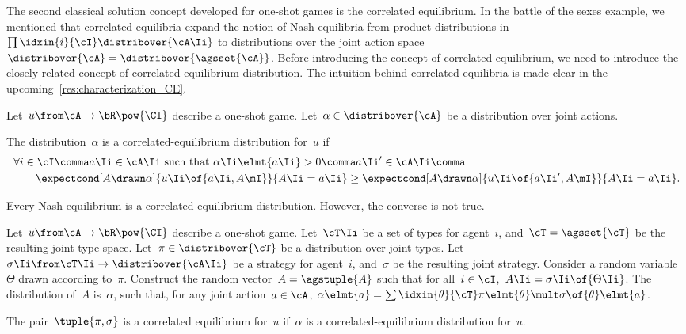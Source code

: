 The second classical solution concept developed for one-shot games is the correlated equilibrium.
In the battle of the sexes example, we mentioned that correlated equilibria expand the notion of Nash equilibria from product distributions in~\(\prod\idxin{i}{\cI} \distribover{\cA\Ii}\) to distributions over the joint action space~\(\distribover{\cA} = \distribover{\agsset{\cA}}\).
Before introducing the concept of correlated equilibrium, we need to introduce the closely related concept of correlated-equilibrium distribution.
The intuition behind correlated equilibria is made clear in the upcoming~\cref{res:characterization_CE}.

\begin{definition}
\label{def:correlated-equilibrium_distribution}
Let~\(u \from \cA \to \bR\pow{\CI}\) describe a one-shot game.
Let~\(\alpha \in \distribover{\cA}\) be a distribution over joint actions.

The distribution~\(\alpha\) is a correlated-equilibrium distribution for~\(u\) if
\[
\begin{aligned}
& \forall i \in \cI \comma
a\Ii \in \cA\Ii \text{ such that } \alpha\Ii \elmt{a\Ii} > 0\comma
a\Ii' \in \cA\Ii \comma \\
& \qquad \expectcond[A \drawn \alpha]{u\Ii \of{a\Ii, A\mI}}{A\Ii = a\Ii}
\ge
\expectcond[A \drawn \alpha]{u\Ii \of{a\Ii', A\mI}}{A\Ii = a\Ii}.
\end{aligned}
\]
\end{definition}

Every Nash equilibrium is a correlated-equilibrium distribution.
However, the converse is not true.

\begin{definition}
\label{def:correlated_equilibrium}
Let~\(u \from \cA \to \bR\pow{\CI}\) describe a one-shot game.
Let~\(\cT\Ii\) be a set of types for agent~\(i\), and~\(\cT = \agsset{\cT}\) be the resulting joint type space.
Let~\(\pi \in \distribover{\cT}\) be a distribution over joint types.
Let~\(\sigma\Ii \from \cT\Ii \to \distribover{\cA\Ii}\) be a strategy for agent~\(i\), and~\(\sigma\) be the resulting joint strategy.
Consider a random variable~\(\Theta\) drawn according to~\(\pi\).
Construct the random vector~\(A = \agstuple{A}\) such that for all~\(i \in \cI\),~\(A\Ii = \sigma\Ii \of{\Theta\Ii}\).
The distribution of~\(A\) is~\(\alpha\), such that, for any joint action~\(a \in \cA\), \(\alpha \elmt{a} = \sum\idxin{\theta}{\cT} \pi \elmt{\theta} \mult \sigma \of{\theta} \elmt{a}\).

The pair~\(\tuple{\pi, \sigma}\) is a correlated equilibrium for~\(u\) if~\(\alpha\) is a correlated-equilibrium distribution for~\(u\).
\end{definition}

